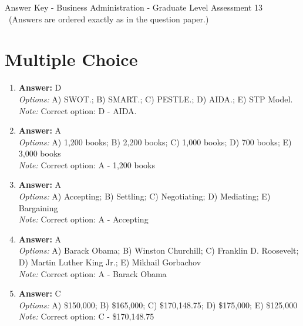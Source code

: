\documentclass[12pt]{article}
\begin{document}
\begin{center}
Answer Key - Business Administration - Graduate Level Assessment 13 \
\small (Answers are ordered exactly as in the question paper.)
\end{center}

\section*{Multiple Choice}
\begin{enumerate}[label=\arabic*.]
\item \textbf{Answer:} D
\\ \textit{Options:} A) SWOT.; B) SMART.; C) PESTLE.; D) AIDA.; E) STP Model.
\\ \textit{Note:} Correct option: D - AIDA.
\item \textbf{Answer:} A
\\ \textit{Options:} A) 1,200 books; B) 2,200 books; C) 1,000 books; D) 700 books; E) 3,000 books
\\ \textit{Note:} Correct option: A - 1,200 books
\item \textbf{Answer:} A
\\ \textit{Options:} A) Accepting; B) Settling; C) Negotiating; D) Mediating; E) Bargaining
\\ \textit{Note:} Correct option: A - Accepting
\item \textbf{Answer:} A
\\ \textit{Options:} A) Barack Obama; B) Winston Churchill; C) Franklin D. Roosevelt; D) Martin Luther King Jr.; E) Mikhail Gorbachov
\\ \textit{Note:} Correct option: A - Barack Obama
\item \textbf{Answer:} C
\\ \textit{Options:} A) \$150,000; B) \$165,000; C) \$170,148.75; D) \$175,000; E) \$125,000
\\ \textit{Note:} Correct option: C - \$170,148.75
\end{enumerate}
\end{document}
